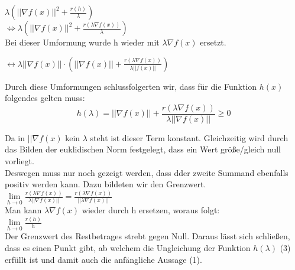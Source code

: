 $\lambda (||\nabla f(x)||^2 + \frac{r(h)}{\lambda})$ \\

$\Leftrightarrow \lambda(||\nabla f(x)||^2 + \frac{r(\lambda \nabla f(x))}{\lambda})$ \\

Bei dieser Umformung wurde h wieder mit $\lambda\nabla f(x)$ ersetzt.

$\leftrightarrow \lambda ||\nabla f(x)|| \cdot (||\nabla f(x)|| + \frac{r(\lambda \nabla f(x))}{\lambda || f(x)||})$


Durch diese Umformungen schlussfolgerten wir, dass f\"ur die Funktion $h(x)$ folgendes gelten muss:\\
\begin{equation} h(\lambda)=||\nabla f(x)|| + \frac{r(\lambda\nabla f(x))}{\lambda||\nabla f(x)||} \geq 0 \end{equation}


Da in $||\nabla f(x)$ kein $\lambda$ steht ist dieser Term konstant. Gleichzeitig wird durch das Bilden der euklidischen Norm festgelegt, dass ein Wert größe/gleich null vorliegt. \\ %
Deswegen muss nur noch gezeigt werden, dass dder zweite Summand ebenfalls positiv werden kann. Dazu bildeten wir den Grenzwert. \\ %
$\lim\limits_{h \rightarrow 0}{\frac{r(\lambda \nabla f(x))}{\lambda ||\nabla f(x)||}} = \frac{r(\lambda \nabla f(x))}{||\lambda  \nabla f(x)||}$ \\ %

Man kann $\lambda \nabla f(x)$ wieder durch h ersetzen, woraus folgt: \\
$\lim\limits_{h \rightarrow 0} \frac{r(h)}{h}$ \\

Der Grenzwert des Restbetrages strebt gegen Null. Daraus lässt sich schließen, dass es einen Punkt gibt, ab welchem die Ungleichung der Funktion $h(\lambda)$ (3) erfüllt ist und damit auch die anfängliche Aussage (1). \\ %
\vspace{15pt}

\vspace{15pt}



